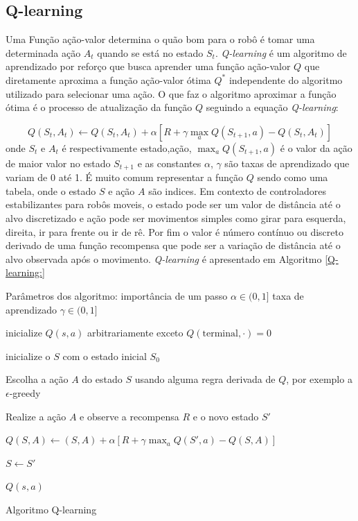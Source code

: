 \subsection{Q-learning}
Uma Função ação-valor determina o quão bom 
para o robô é tomar uma determinada ação $A_t$ quando se está no estado
$S_t$. \textit{Q-learning} é um algoritmo de aprendizado por reforço que
busca aprender uma função ação-valor $Q$ que diretamente aproxima
a função ação-valor ótima $Q^*$ independente do algoritmo utilizado
para selecionar uma ação. O que faz o algoritmo aproximar a função ótima
é o processo de atualização da função $Q$ seguindo a equação \textit{Q-learning}:

\begin{equation} 
    Q(S_t,A_t) \leftarrow Q(S_t,A_t) + \alpha[R + \gamma  \max_aQ(S_{t +1},a) - Q(S_t,A_t)]
\end{equation}
onde $S_t$ e $A_t$ é respectivamente estado,ação, $\max_aQ(S_{t +1},a)$ é o valor da
ação de maior valor no estado $S_{t+1}$ e as constantes $\alpha$, $\gamma$ são taxas
de aprendizado que variam de 0 até 1. É muito comum representar a função $Q$
sendo como uma tabela, onde o estado $S$ e ação $A$ são indices. Em contexto de
controladores estabilizantes para robôs moveis, o estado pode ser um
valor de distância até o alvo discretizado e ação pode ser movimentos simples
como girar para esquerda, direita, ir para frente ou ir de rê. Por fim o valor é
número contínuo ou discreto derivado de uma função recompensa que pode ser
a variação de distância até o alvo observada após o movimento.
\textit{Q-learning} é apresentado em Algoritmo  \ref{Q-learning:}

\begin{algorithm}[H]
    \label{Q-learning:}
    Parâmetros dos algoritmo: importância de um passo $\alpha \in (0,1]$
    taxa de aprendizado $\gamma \in (0,1] $

    
    
    inicialize $Q(s,a)$ arbitrariamente exceto $Q(\text{terminal},\cdot ) = 0$

     {
        inicialize o $S$ com o estado inicial $S_0$

        
         {
            Escolha a ação $A$ do estado $S$ usando alguma regra derivada de $Q$,
            por exemplo a $\epsilon$-greedy

            Realize a ação $A$ e observe a recompensa $R$ e o novo estado $S'$
            
            $Q(S,A) \leftarrow (S,A) + \alpha[R + \gamma \max_aQ(S',a) - Q(S,A)]$
            
            $S \leftarrow S'$


        }
        
    }
    \Retorna $Q(s,a)$
    \caption{Algoritmo Q-learning}
    
\end{algorithm}

